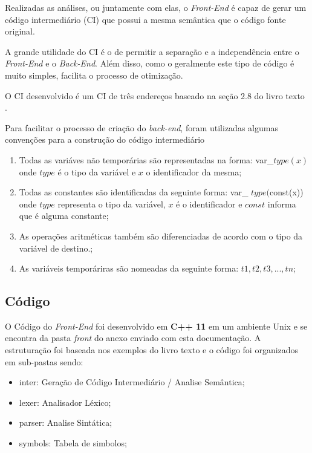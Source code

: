 \documentclass[12pt]{article}
\begin{document}
Realizadas as análises, ou juntamente com elas, o \textit{Front-End} é capaz de gerar um código intermediário (CI) que possui a mesma semântica que o código fonte original.

A grande utilidade do CI é o de permitir a separação e a independência entre o \textit{Front-End} e o \textit{Back-End}. Além disso, como o geralmente este tipo de código é muito simples, facilita o processo de otimização.

O CI desenvolvido é um CI de três endereços baseado na seção 2.8 do livro texto \cite{Aho:2006:CPT:1177220}.

Para facilitar o processo de criação do \textit{back-end}, foram utilizadas algumas convenções para a construção do código intermediário

\begin{enumerate}
\item Todas as variáves não temporárias são representadas na forma: var\_$type(x)$ onde $type$ é o tipo da variável e $x$ o identificador da mesma;

\item Todas as constantes são identificadas da seguinte forma: var\_ $ type( $const(x)) onde $type$ representa o tipo da variável, $x$ é o identificador e $const$ informa que é alguma constante;

\item As operações aritméticas também são diferenciadas de acordo com o tipo da variável de destino.;

\item As variáveis temporáriras são nomeadas da seguinte forma: $t1, t2, t3, ..., tn$;

\end{enumerate}

\subsection{Código}

O Código do \textit{Front-End} foi desenvolvido em \textbf{C++ 11} em um ambiente Unix e se encontra da pasta \textit{front} do anexo enviado com esta documentação. A estruturação foi baseada nos exemplos do livro texto e o código foi organizados em sub-pastas sendo:

\begin{itemize}
\item inter: Geração de Código Intermediário / Analise Semântica;
\item lexer: Analisador Léxico;
\item parser: Analise Sintática;
\item symbols: Tabela de simbolos;
\end{itemize}
\end{document}
